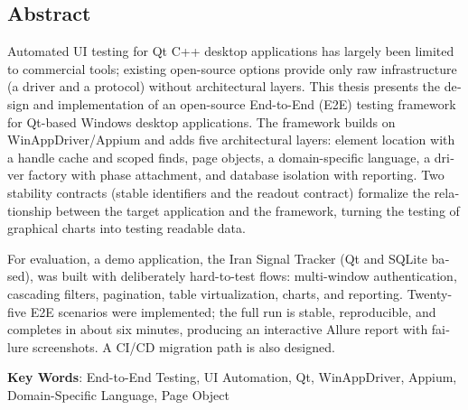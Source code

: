 \clearpage
\begin{latin}
\section*{Abstract}

Automated UI testing for Qt C++ desktop applications has largely been limited to commercial tools; existing open-source options provide only raw infrastructure (a driver and a protocol) without architectural layers. This thesis presents the design and implementation of an open-source End-to-End (E2E) testing framework for Qt-based Windows desktop applications. The framework builds on WinAppDriver/Appium and adds five architectural layers: element location with a handle cache and scoped finds, page objects, a domain-specific language, a driver factory with phase attachment, and database isolation with reporting. Two stability contracts (stable identifiers and the readout contract) formalize the relationship between the target application and the framework, turning the testing of graphical charts into testing readable data.

For evaluation, a demo application, the Iran Signal Tracker (Qt and SQLite based), was built with deliberately hard-to-test flows: multi-window authentication, cascading filters, pagination, table virtualization, charts, and reporting. Twenty-five E2E scenarios were implemented; the full run is stable, reproducible, and completes in about six minutes, producing an interactive Allure report with failure screenshots. A CI/CD migration path is also designed.

\vskip 5mm
\textbf{Key Words}: End-to-End Testing, UI Automation, Qt, WinAppDriver, Appium, Domain-Specific Language, Page Object

\end{latin}
